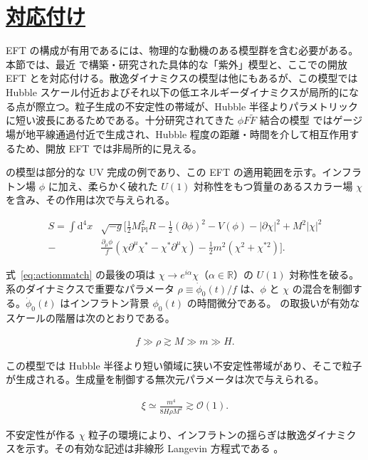 \documentclass[a4paper,11pt]{ltjsarticle}
\newcommand{\sectionlink}[1]{\section[#1]{\hyperlink{toc}{#1}}}
\numberwithin{equation}{section}
\newcommand{\dd}{\mathrm{d}}
\newcommand{\ee}{e}
\newcommand{\Eq}[1]{Eq.~(\ref{#1})}
\renewcommand{\Eq}[1]{式~\eqref{#1}}
\begin{document}
\sectionlink{対応付け}\label{sec:matching}

EFT の構成が有用であるには、物理的な動機のある模型群を含む必要がある。本節では、最近 \cite{Creminelli:2023aly} で構築・研究された具体的な「紫外」模型と、ここでの開放 EFT とを対応付ける。散逸ダイナミクスの模型は他にもあるが、この模型では Hubble スケール付近およびそれ以下の低エネルギーダイナミクスが局所的になる点が際立つ。粒子生成の不安定性の帯域が、Hubble 半径よりパラメトリックに短い波長にあるためである。十分研究されてきた $\phi F\widetilde F$ 結合の模型 \cite{Anber:2009ua} ではゲージ場が地平線通過付近で生成され、Hubble 程度の距離・時間を介して相互作用するため、開放 EFT では非局所的に見える。

\cite{Creminelli:2023aly} の模型は部分的な UV 完成の例であり、この EFT の適用範囲を示す。インフラトン場 $\phi$ に加え、柔らかく破れた $U(1)$ 対称性をもつ質量のあるスカラー場 $\chi$ を含み、その作用は次で与えられる。

\begin{align}\label{eq:actionmatch}
S= \int \dd^4 x &\sqrt{- g} \bigg[ \frac{1}{2} M_{\mathrm{Pl}}^2  R - \frac{1}{2} \left(\partial \phi \right)^2 - V(\phi) - \left|\partial \chi \right|^2 + M^2 \left| \chi \right|^2 \nonumber \\
- &\frac{\partial_\mu \phi}{f}\left( \chi \partial^\mu \chi^* - \chi^* \partial^\mu \chi\right) - \frac{1}{2}m^2\left(\chi^2 + \chi^{*2}\right)\bigg].
\end{align}

\Eq{eq:actionmatch} の最後の項は $\chi\rightarrow\ee^{i\alpha}\chi$（$\alpha\in\mathbb{R}$）の $U(1)$ 対称性を破る。系のダイナミクスで重要なパラメータ $\rho\equiv\dot\phi_0(t)/f$ は、$\phi$ と $\chi$ の混合を制御する。$\dot\phi_0(t)$ はインフラトン背景 $\phi_0(t)$ の時間微分である。\cite{Creminelli:2023aly} の取扱いが有効なスケールの階層は次のとおりである。

\begin{align}
f \gg \rho \gtrsim M \gg m \gg H.
\end{align}

この模型では Hubble 半径より短い領域に狭い不安定性帯域があり、そこで粒子が生成される。生成量を制御する無次元パラメータは次で与えられる。

\begin{align}
\xi \simeq \frac{m^4}{8 H \rho M^2} \gtrsim \mathcal{O}(1).
\end{align}

不安定性が作る $\chi$ 粒子の環境により、インフラトンの揺らぎは散逸ダイナミクスを示す。その有効な記述は非線形 Langevin 方程式である \cite{Creminelli:2023aly}。
\end{document}
